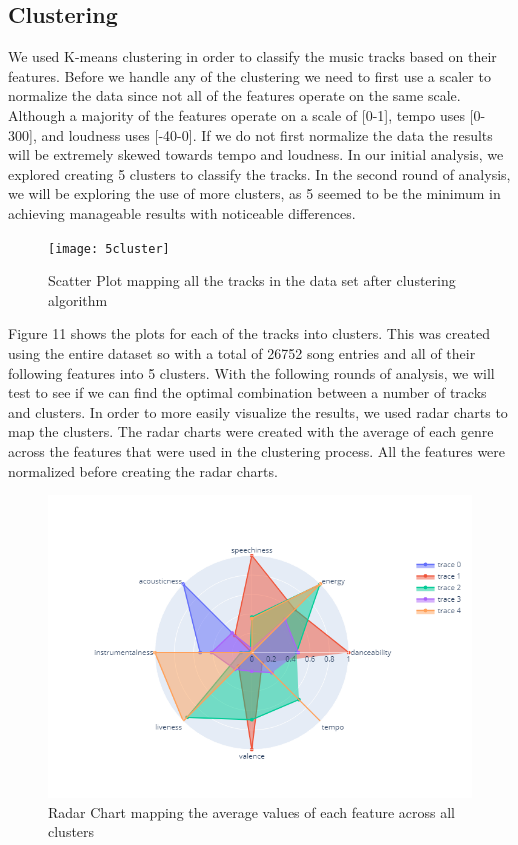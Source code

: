 \documentclass[11pt, a4paper, twocolumn]{article}
\begin{document}
\subsection{Clustering}
We used K-means clustering in order to classify the music tracks based on their features. Before we handle any of the clustering we need to first use a scaler to normalize the data since not all of the features operate on the same scale. Although a majority of the features operate on a scale of [0-1], tempo uses [0-300], and loudness uses [-40-0]. If we do not first normalize the data the results will be extremely skewed towards tempo and loudness. In our initial analysis, we explored creating 5 clusters to classify the tracks. In the second round of analysis, we will be exploring the use of more clusters, as 5 seemed to be the minimum in achieving manageable results with noticeable differences. 
\begin{figure}[h!]
\texttt{[image: 5cluster]}
\caption{Scatter Plot mapping all the tracks in the data set after clustering algorithm} 
\end{figure}
Figure 11 shows the plots for each of the tracks into clusters. This was created using the entire dataset so with a total of 26752 song entries and all of their following features into 5 clusters. With the following rounds of analysis, we will test to see if we can find the optimal combination between a number of tracks and clusters. 
In order to more easily visualize the results, we used radar charts to map the clusters. The radar charts were created with the average of each genre across the features that were used in the clustering process. All the features were normalized before creating the radar charts.
\begin{figure}[h!]
\centerline{\includegraphics[scale=0.35]{radar}}
\caption{Radar Chart mapping the average values of each feature across all clusters} 
\end{figure}
\end{document}
